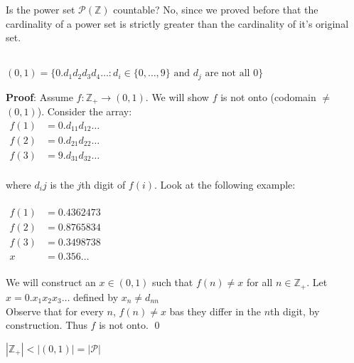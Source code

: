 \documentclass[11pt]{scrartcl}
\begin{document}
\begin{example}
    Is the power set $\mathcal{P}(\mathbb{Z})$ countable?  No, since we proved before that the cardinality of a power set is strictly greater than the cardinality of it's original set.
\end{example}

\begin{definition}[(0,1)]\\
    $(0,1) = \{0.d_1d_2d_3d_4\dots : d_i \in \{0, \dots , 9\} \text{ and $d_j$ are not all $0$} \}$ 
\end{definition}
\begin{theorem}[(0, 1) is uncountable]
    \textbf{Proof}: Assume $f: \mathbb{Z}_+ \rightarrow (0, 1)$.  We will show $f$ is not onto (codomain $\neq$ $(0, 1)$).  Consider the array: \\
    $\begin{array}{cc}
         f(1) &= 0.d_{11}d_{12}\dots   \\
         f(2) &= 0.d_{21}d_{22}\dots  \\
         f(3) &= 9.d_{31}d_{32}\dots 
    \end{array}$\\
    \\
    where $d_ij$ is the $j$th digit of $f(i)$. Look at the following example:\\
    \\
    $\begin{array}{cc}
         f(1) &= 0. 4362473  \\
         f(2) &= 0. 8765834  \\
         f(3) &= 0. 3498738  \\
         x    &= 0.356 \dots  
    \end{array}$\\
    \\
    We will construct an $x\in (0,1)$ such that $f(n) \neq x$ for all $n \in \mathbb{Z}_+$. Let $x = 0.x_1x_2x_3 \dots$ defined by $x_n \neq d_{nn}$\\
    Observe that for every $n$, $f(n) \neq x$ bas they differ in the $n$th digit, by construction.  Thus $f$ is not onto. \qed
\end{theorem}
\begin{remark}
    $|\mathbb{Z}_+| < |(0,1)|= |\mathcal{P}|$
\end{remark}
\end{document}

